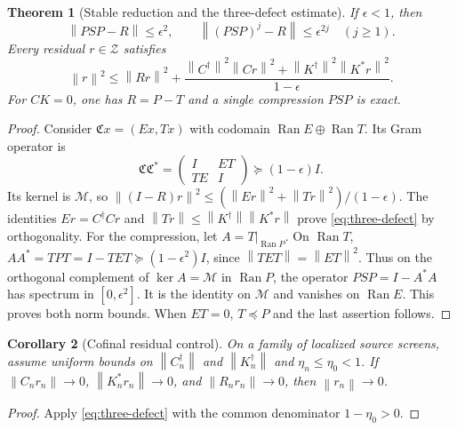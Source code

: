 \documentclass[11pt,a4paper,oneside]{book}
\theoremstyle{plain}
\newtheorem{theorem}{Theorem}[chapter]
\newtheorem{corollary}[theorem]{Corollary}
\theoremstyle{definition}
\theoremstyle{remark}
\newcommand{\Ran}{\operatorname{Ran}}
\newcommand{\norm}[1]{\left\lVert#1\right\rVert}
\newcommand{\src}[2]{\cite{#1}}
\begin{document}
\begin{theorem}[Stable reduction and the three-defect estimate]
\label{thm:three-defect}
If $\epsilon<1$, then
\begin{equation}
 \norm{PSP-R}\le\epsilon^2,\qquad
 \norm{(PSP)^j-R}\le\epsilon^{2j}\quad(j\ge1).
 \label{eq:constraint-compression}
\end{equation}
Every residual $r\in\mathcal Z$ satisfies
\begin{equation}
 \norm r^2\le\norm{Rr}^2+
 \frac{\norm{C^\dagger}^2\norm{Cr}^2+
       \norm{K^\dagger}^2\norm{K^*r}^2}{1-\epsilon}.
 \label{eq:three-defect}
\end{equation}
For $CK=0$, one has $R=P-T$ and a single compression $PSP$ is exact.
\end{theorem}
\begin{proof}
Consider $\mathfrak Cx=(Ex,Tx)$ with codomain
$\Ran E\oplus\Ran T$.  Its Gram operator is
\[
 \mathfrak C\mathfrak C^*=
 \begin{pmatrix}I&ET\\TE&I\end{pmatrix}\succeq(1-\epsilon)I.
\]
Its kernel is $\mathcal M$, so
$\norm{(I-R)r}^2\le(\norm{Er}^2+\norm{Tr}^2)/(1-\epsilon)$.
The identities $Er=C^\dagger Cr$ and
$\norm{Tr}\le\norm{K^\dagger}\norm{K^*r}$ prove
\eqref{eq:three-defect} by orthogonality.
For the compression, let $A=T|_{\Ran P}$.  On $\Ran T$,
$AA^*=TPT=I-TET\succeq(1-\epsilon^2)I$, since
$\norm{TET}=\norm{ET}^2$.  Thus on the orthogonal complement of
$\ker A=\mathcal M$ in $\Ran P$, the operator
$PSP=I-A^*A$ has spectrum in $[0,\epsilon^2]$.  It is the identity
on $\mathcal M$ and vanishes on $\Ran E$.  This proves both norm
bounds.  When $ET=0$, $T\preceq P$ and the last assertion follows.
\end{proof}
\src{R14}{thm:v14v18-sharp,cor:v14v18-compression,thm:v14v18-joint,thm:v14v18-three}

\begin{corollary}[Cofinal residual control]
\label{cor:cofinal-three-defect}
On a family of localized source screens, assume uniform bounds on
$\norm{C_n^\dagger}$ and $\norm{K_n^\dagger}$ and
$\eta_n\le\eta_0<1$.  If
$\norm{C_nr_n}\to0$, $\norm{K_n^*r_n}\to0$, and
$\norm{R_nr_n}\to0$, then $\norm{r_n}\to0$.
\end{corollary}
\begin{proof}
Apply \eqref{eq:three-defect} with the common denominator
$1-\eta_0>0$.
\end{proof}
\src{R14}{thm:v14v18-cofinal}
\end{document}
